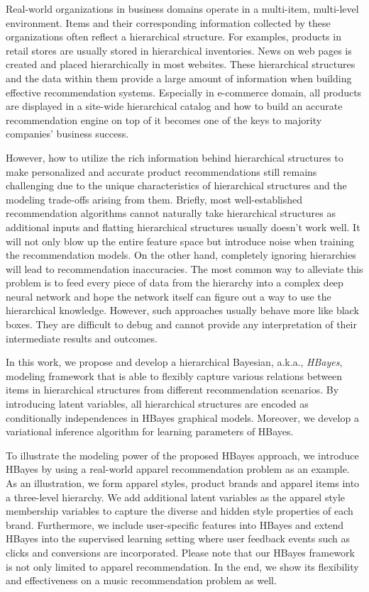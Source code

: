 Real-world organizations in business domains operate in a multi-item, multi-level environment. Items and their corresponding information collected by these organizations often reflect a hierarchical structure. For examples, products in retail stores are usually stored in hierarchical inventories. News on web pages is created and placed hierarchically in most websites. These hierarchical structures and the data within them provide a large amount of information when building effective recommendation systems. Especially in e-commerce domain, all products are displayed in a site-wide hierarchical catalog and how to build an accurate recommendation engine on top of it becomes one of the keys to majority companies' business success. 

However, how to utilize the rich information behind hierarchical structures to make personalized and accurate product recommendations still remains challenging due to the unique characteristics of hierarchical structures and the modeling trade-offs arising from them. Briefly, most well-established recommendation algorithms cannot naturally take hierarchical structures as additional inputs and flatting hierarchical structures usually doesn't work well. It will not only blow up the entire feature space but introduce noise when training the recommendation models. On the other hand, completely ignoring hierarchies will lead to recommendation inaccuracies. The most common way to alleviate this problem is to feed every piece of data from the hierarchy into a complex deep neural network and hope the network itself can figure out a way to use the hierarchical knowledge. However, such approaches usually behave more like black boxes. They are difficult to debug and cannot provide any interpretation of their intermediate results and outcomes.

In this work, we propose and develop a hierarchical Bayesian, a.k.a., \emph{HBayes}, modeling framework that is able to flexibly capture various relations between items in hierarchical structures from different recommendation scenarios. By introducing latent variables, all hierarchical structures are encoded as conditionally independences in HBayes graphical models. Moreover, we develop a variational inference algorithm for learning parameters of HBayes. 

To illustrate the modeling power of the proposed HBayes approach, we introduce HBayes by using a real-world apparel recommendation problem as an example. As an illustration, we form apparel styles, product brands and apparel items into a three-level hierarchy. We add additional latent variables as the apparel style membership variables to capture the diverse and hidden style properties of each brand. Furthermore, we include user-specific features into HBayes and extend HBayes into the supervised learning setting where user feedback events such as clicks and conversions are incorporated. Please note that our HBayes framework is not only limited to apparel recommendation. In the end, we show its flexibility and effectiveness on a music recommendation problem as well.

